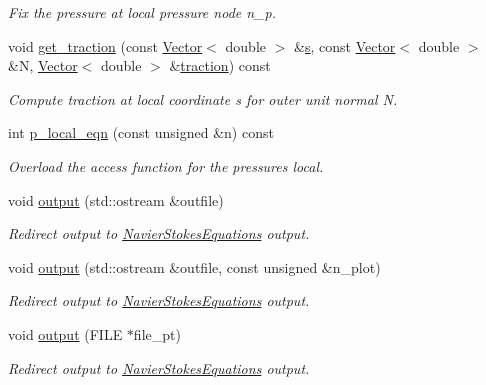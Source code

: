 \begin{DoxyCompactItemize}
\begin{DoxyCompactList}\small\item\em Fix the pressure at local pressure node n\+\_\+p. \end{DoxyCompactList}\item 
void \hyperlink{classoomph_1_1AxisymmetricQTaylorHoodElement_abfaf2fb0ff51a888f77c724af8c20809}{get\+\_\+traction} (const \hyperlink{classoomph_1_1Vector}{Vector}$<$ double $>$ \&\hyperlink{cfortran_8h_ab7123126e4885ef647dd9c6e3807a21c}{s}, const \hyperlink{classoomph_1_1Vector}{Vector}$<$ double $>$ \&N, \hyperlink{classoomph_1_1Vector}{Vector}$<$ double $>$ \&\hyperlink{classoomph_1_1AxisymmetricNavierStokesEquations_a0a5523b91d5191c2f9e23fe8d74f4e07}{traction}) const
\begin{DoxyCompactList}\small\item\em Compute traction at local coordinate s for outer unit normal N. \end{DoxyCompactList}\item 
int \hyperlink{classoomph_1_1AxisymmetricQTaylorHoodElement_a5593ee69e94a15cca6f309bb38717913}{p\+\_\+local\+\_\+eqn} (const unsigned \&n) const
\begin{DoxyCompactList}\small\item\em Overload the access function for the pressure\textquotesingle{}s local. \end{DoxyCompactList}\item 
void \hyperlink{classoomph_1_1AxisymmetricQTaylorHoodElement_aa092b03db26878057c3d3c92496d752d}{output} (std\+::ostream \&outfile)
\begin{DoxyCompactList}\small\item\em Redirect output to \hyperlink{classoomph_1_1NavierStokesEquations}{Navier\+Stokes\+Equations} output. \end{DoxyCompactList}\item 
void \hyperlink{classoomph_1_1AxisymmetricQTaylorHoodElement_a73bc9729dd01b61e467d4fdc7d8b802c}{output} (std\+::ostream \&outfile, const unsigned \&n\+\_\+plot)
\begin{DoxyCompactList}\small\item\em Redirect output to \hyperlink{classoomph_1_1NavierStokesEquations}{Navier\+Stokes\+Equations} output. \end{DoxyCompactList}\item 
void \hyperlink{classoomph_1_1AxisymmetricQTaylorHoodElement_a91861ce04f934aeae956c9d938ce337f}{output} (F\+I\+LE $\ast$file\+\_\+pt)
\begin{DoxyCompactList}\small\item\em Redirect output to \hyperlink{classoomph_1_1NavierStokesEquations}{Navier\+Stokes\+Equations} output. \end{DoxyCompactList}\item 

\end{DoxyCompactItemize}
